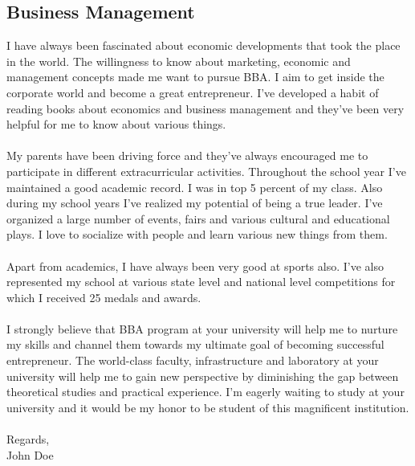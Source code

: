 \documentclass{article}
\begin{document}
    \subsection{Business Management}
    I have always been fascinated about economic developments
    that took the place in the world. The willingness to know
    about marketing, economic and management concepts made me 
    want to pursue BBA. I aim to get inside the corporate world 
    and become a great entrepreneur. I've developed a habit of 
    reading books about economics and business management and 
    they've been very helpful for me to know about various things.\\
    \\ My parents have been driving force and they've always 
    encouraged me to participate in different extracurricular 
    activities. Throughout the school year I've maintained a good 
    academic record. I was in top 5 percent of my class. Also during
    my school years I've realized my potential of being a true leader.
    I've organized a large number of events, fairs and various cultural
    and educational plays. I love to socialize with people and learn
    various new things from them.\\\\
    Apart from academics, I have always been very good at sports also.
    I've also represented my school at various state level and 
    national level competitions for which I received 25 medals and
    awards.\\\\
    I strongly believe that BBA program at your university will help 
    me to nurture my skills and channel them towards my ultimate goal
    of becoming successful entrepreneur. The world-class faculty,
    infrastructure and laboratory at your university will help me to
    gain new perspective by diminishing the gap between theoretical
    studies and practical experience. I'm eagerly waiting to study
    at your university and it would be my honor to be student of 
    this magnificent institution.\\\\
    Regards,\\
    John Doe


	
\end{document}

